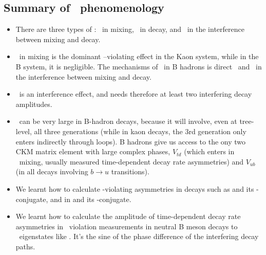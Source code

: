  

\subsection{Summary of \cpv\ phenomenology}
\begin{itemize}
\item There are three types of \cpv: \cpv\ in mixing, \cpv\ in decay, and \cpv\ in the interference between mixing and decay.
\item \cpv\ in mixing is the dominant \cp--violating effect in the Kaon system, while in the B system, it is negligible. The mechanisms of \cpv\ in B hadrons is direct \cpv\ and \cpv\ in the interference between mixing and decay.
\item \cpv\ is an interference effect, and needs therefore at least two interfering decay amplitudes.
\item \cpv\ can be very large in B-hadron decays, because it will involve, even at tree-level, all three generations (while in kaon decays, the 3rd generation only enters indirectly through loops). B hadrons give us access to the ony two CKM matrix element with large complex phases, $V_{td}$ (which enters in \Bdo\ mixing, usually measured time-dependent decay rate asymmetries) and $V_{ub}$ (in all decays involving $b \to u$ transitions).
\item We learnt how to calculate \cp-violating asymmetries in decays such as  and its \cp-conjugate, and in  and its \cp-conjugate.
\item We learnt how to calculate the amplitude of time-dependent decay rate asymmetries in \cp\ violation measurements in neutral B meson decays to \cp\ eigenstates like . It's the sine of the phase difference of the interfering decay paths.
\end{itemize}

